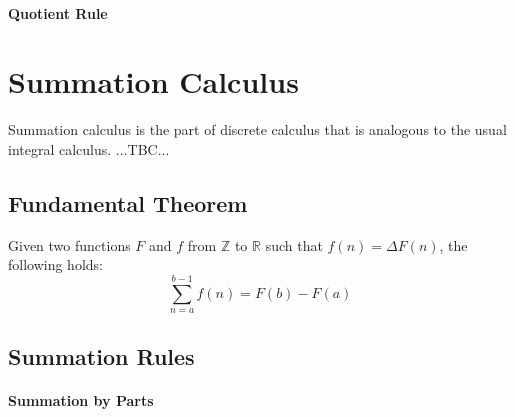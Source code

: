 

\paragraph{Quotient Rule}



\section{Summation Calculus}
Summation calculus is the part of discrete calculus that is analogous to the usual integral calculus. ...TBC...

\subsection{Fundamental Theorem}
Given two functions $F$ and $f$ from $\mathbb{Z}$ to $\mathbb{R}$ such that $f(n) = \Delta F(n)$, the following holds:
\begin{equation}
 \sum_{n=a}^{b-1} f(n) = F(b) - F(a)
\end{equation}






\subsection{Summation Rules}

\paragraph{Summation by Parts}

